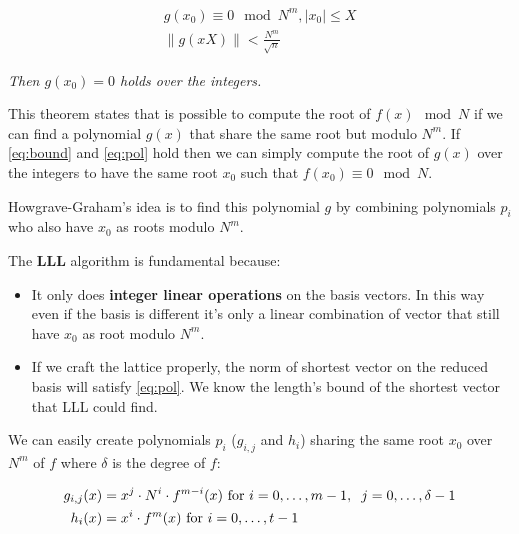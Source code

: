 \documentclass[a4paper,12pt]{report}
\begin{document}
\begin{center}
    \begin{eqnarray}
        g(x_0) \equiv 0 \mod N^m, |x_0| \le X \label{eq:bound} \\
         \lVert g(xX) \rVert < \frac{N^m}{\sqrt{n}} \label{eq:pol}
    \end{eqnarray}
\end{center}

\textit{Then $g(x_0) = 0$ holds over the integers.}

\vspace*{10px}

This theorem states that is possible to compute the root of $f(x) \mod N$ if we can find a polynomial $g(x)$ that share the same root but modulo $N^m$.
If \ref{eq:bound} and \ref{eq:pol} hold then we can simply compute the root of $g(x)$ over the integers to have the same root $x_0$
such that $f(x_0) \equiv 0 \mod N$.

Howgrave-Graham's idea is to find this polynomial $g$ by combining polynomials $p_i$ who also have $x_0$ as roots modulo $N^m$.

\vspace*{10px}

The \textbf{LLL} algorithm is fundamental because:

\begin{itemize}
    \item It only does \textbf{integer linear operations} on the basis vectors.
        In this way even if the basis is different it's only a linear combination of vector that still have $x_0$ as root
        modulo $N^m$.
    \item If we craft the lattice properly, the norm of shortest vector on the reduced basis will satisfy \ref{eq:pol}.
        We know the length's bound of the shortest vector that LLL could find.
\end{itemize}

We can easily create polynomials $p_i$ ($g_{i,j}$ and $h_i$)  sharing the same root $x_0$ over $N^m$ of $f$ where $\delta$ is the degree of $f$:

\begin{center}
    \begin{eqnarray}
        g_{i,j}(x) &= x^j \cdot N^i \cdot f^{m-i}(x) \text{ for } i = 0,\hdots,m-1,\hspace{2mm} j=0,\hdots,\delta-1 \label{eq:create_pol} \\
        h_i(x) &= x^i \cdot f^m(x) \text{ for } i = 0,\hdots,t-1 
    \end{eqnarray}
\end{center}
\end{document}
